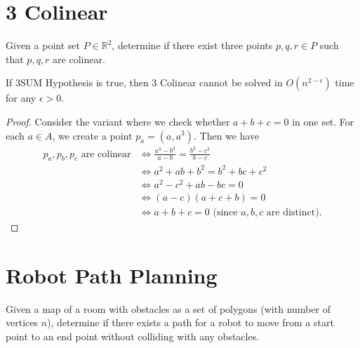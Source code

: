 \section{3 Colinear}

\begin{problem}[3 Colinear]
Given a point set $P\in \mathbb R^2$, determine if there exist three points $p, q, r \in P$ such that $p, q, r$ are colinear.
\end{problem}
\begin{theorem}
	If 3SUM Hypothesis is true, then 3 Colinear cannot be solved in $O(n^{2-\epsilon})$ time for any $\epsilon > 0$.
\end{theorem}

\begin{proof}
	Consider the variant where we check whether $a+b+c = 0$ in one set.
	For each $a \in A$, we create a point $p_a = (a, a^3)$.
	Then we have
	\begin{align*}
		\text{$p_a, p_b, p_c$ are colinear} & \iff \frac{a^3 - b^3}{a - b} = \frac{b^3 - c^3}{b - c}     \\
		                                    & \iff a^2 + ab + b^2 = b^2 + bc + c^2                       \\
		                                    & \iff a^2 - c^2 + ab - bc = 0                               \\
		                                    & \iff (a - c)(a + c + b) = 0                                \\
		                                    & \iff a + b + c = 0 \text{ (since $a, b, c$ are distinct)}.
	\end{align*}
\end{proof}

\section{Robot Path Planning}

\begin{problem}
Given a map of a room with obstacles as a set of polygons (with number of vertices $n$), determine if there exists a path for a robot to move from a start point to an end point without colliding with any obstacles.
\end{problem}


